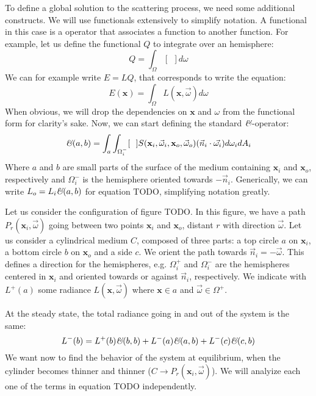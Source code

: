 To define a global solution to the scattering process, we need some additional constructs. We will use functionals extensively to simplify notation. A functional in this case is a operator that associates a function to another function. For example, let us define the functional $Q$ to integrate over an hemisphere:
$$
Q = \int_\Omega [\ \ ] d\omega
$$
We can for example write $E = LQ$, that corresponds to write the equation:
$$
E(\mathbf{x}) = \int_\Omega L(\mathbf{x}, \vec{\omega}) d\omega
$$
When obvious, we will drop the dependencies on $\mathbf{x}$ and $\omega$ from the functional form for clarity's sake. Now, we can start defining the standard $\textit{\text{\&}}$-operator:
$$
\textit{\text{\&}}(a,b) = \int_a \int_{\Omega_i^-} [\ \ ] S(\mathbf{x}_i, \vec{\omega}_i, \mathbf{x}_o, \vec{\omega}_o) (\vec{n}_i \cdot \vec{\omega_i}) d \omega_i d A_i
$$
Where $a$ and $b$ are small parts of the surface of the medium containing $\mathbf{x}_i$ and $\mathbf{x}_o$, respectively and $\Omega_i^-$ is the hemisphere oriented towards $-\vec{n}_i$. Generically, we can write $L_o = L_i \textit{\text{\&}}(a,b)$ for equation TODO, simplifying notation greatly.

Let us consider the configuration of figure TODO. In this figure, we have a path $P_r(\mathbf{x}_i,\vec{\omega})$ going between two points $\mathbf{x}_i$ and $\mathbf{x}_o$, distant $r$ with direction $\vec{\omega}$. Let us consider a  cylindrical medium $C$, composed of three parts: a top circle $a$ on $\mathbf{x}_i$, a bottom circle $b$ on $\mathbf{x}_o$ and a side $c$. We orient the path towards $\vec{n}_i = -\vec{\omega}$. This defines a direction for the hemispheres, e.g. $\Omega_i^+$ and $\Omega_i^-$ are the hemispheres centered in $\mathbf{x}_i$  and oriented towards or against $\vec{n}_i$, respectively. We indicate with $L^+(a)$ some radiance $L(\mathbf{x}, \vec{\omega})$ where $\mathbf{x} \in a$ and $\vec{\omega} \in \Omega^+$.

At the steady state, the total radiance going in and out of the system is the same:
$$
L^-(b) = L^+(b)\textit{\text{\&}}(b,b) + L^-(a)\textit{\text{\&}}(a,b)  + L^-(c)\textit{\text{\&}}(c,b)
$$
We want now to find the behavior of the system at equilibrium, when the cylinder becomes thinner and thinner ($C\rightarrow P_r(\mathbf{x}_i,\vec{\omega})$). We will analyize each one of the terms in equation TODO independently. 

